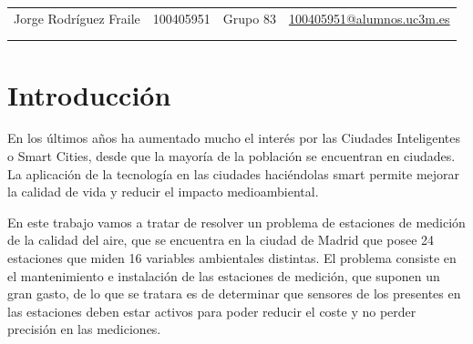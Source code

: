 \documentclass[12pt, spanish, pdftex]{UC3M_document}
\author{Jorge Rodríguez Fraile}
\begin{document}
\begin{titlepage}
	
	\begin{table}[b]
		\centering
		\begin{tabular}{ cccc }
			\large Jorge Rodríguez Fraile & \large 100405951 & \large Grupo 83 & \href{mailto:100405951@alumnos.uc3m.es}{\large 100405951@alumnos.uc3m.es} \\
			                              &                  &                 &                                                                           \\
			                              &                  &                 &                                                                           \\
		\end{tabular}
	\end{table}
	
\end{titlepage}

\newpage

\begin{spacing}{0.5}
	\hypersetup{linkcolor=black}    %
	\tableofcontents\newpage        %
	\listoffigures\newpage          %
	\listoftables\newpage           %
\end{spacing}


\section{Introducción}
En los últimos años ha aumentado mucho el interés por las Ciudades Inteligentes o Smart Cities, desde que la mayoría de la población se encuentran en ciudades. La aplicación de la tecnología en las ciudades haciéndolas smart permite mejorar la calidad de vida y reducir el impacto medioambiental.

En este trabajo vamos a tratar de resolver un problema de estaciones de medición de la calidad del aire, que se encuentra en la ciudad de Madrid que posee 24 estaciones que miden 16 variables ambientales distintas. El problema consiste en el mantenimiento e instalación de las estaciones de medición, que suponen un gran gasto, de lo que se tratara es de determinar que sensores de los presentes en las estaciones deben estar activos para poder reducir el coste y no perder precisión en las mediciones.
\end{document}
